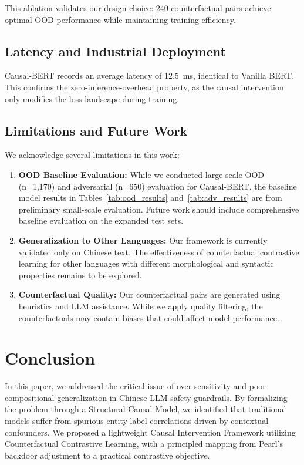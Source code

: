 \documentclass{acmart}
\begin{document}
This ablation validates our design choice: 240 counterfactual pairs achieve optimal OOD performance while maintaining training efficiency.

\subsection{Latency and Industrial Deployment}
Causal-BERT records an average latency of 12.5~ms, identical to Vanilla BERT. This confirms the zero-inference-overhead property, as the causal intervention only modifies the loss landscape during training.

\subsection{Limitations and Future Work}

We acknowledge several limitations in this work:

\begin{enumerate}
\item \textbf{OOD Baseline Evaluation:} While we conducted large-scale OOD (n=1,170) and adversarial (n=650) evaluation for Causal-BERT, the baseline model results in Tables~\ref{tab:ood_results} and~\ref{tab:adv_results} are from preliminary small-scale evaluation. Future work should include comprehensive baseline evaluation on the expanded test sets.

\item \textbf{Generalization to Other Languages:} Our framework is currently validated only on Chinese text. The effectiveness of counterfactual contrastive learning for other languages with different morphological and syntactic properties remains to be explored.

\item \textbf{Counterfactual Quality:} Our counterfactual pairs are generated using heuristics and LLM assistance. While we apply quality filtering, the counterfactuals may contain biases that could affect model performance.
\end{enumerate}

\section{Conclusion}
In this paper, we addressed the critical issue of over-sensitivity and poor compositional generalization in Chinese LLM safety guardrails. By formalizing the problem through a Structural Causal Model, we identified that traditional models suffer from spurious entity-label correlations driven by contextual confounders. We proposed a lightweight Causal Intervention Framework utilizing Counterfactual Contrastive Learning, with a principled mapping from Pearl's backdoor adjustment to a practical contrastive objective.
\end{document}
